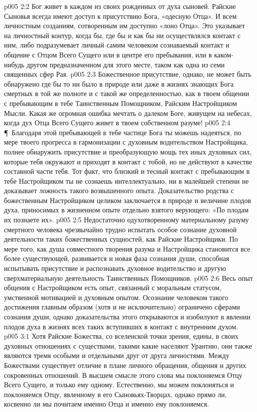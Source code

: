 \vs p005 2:2 Бог живет в каждом из своих рожденных от духа сыновей. Райские Сыновья всегда имеют доступ к присутствию Бога, «одесную Отца». И всем личностным созданиям, сотворенным им доступно «лоно Отца». Это указывает на личностный контур, когда бы, где бы и как бы ни осуществлялся контакт с ним, либо подразумевает личный самим человеком сознаваемый контакт и общение с Отцом Всего Сущего или в центре его пребывания, или в каком\hyp{}нибудь другом предназначенном для этого месте, таком как одна из семи священных сфер Рая.
\vs p005 2:3 Божественное присутствие, однако, не может быть обнаружено где бы то ни было в природе или даже в жизнях знающих Бога смертных в той же полноте и с такой же определенностью, как в твоем общении с пребывающим в тебе Таинственным Помощником, Райским Настройщиком Мысли. Какая же огромная ошибка мечтать о далеком Боге, живущем на небесах, когда дух Отца Всего Сущего живет в твоем собственном разуме!
\vs p005 2:4 \P\ Благодаря этой пребывающей в тебе частице Бога ты можешь надеяться, по мере твоего прогресса в гармонизации с духовным водительством Настройщика, полнее обнаружить присутствие и преобразующую мощь тех иных духовных сил, которые тебя окружают и приходят в контакт с тобой, но не действуют в качестве составной части тебя. Тот факт, что близкий и тесный контакт с пребывающим в тебе Настройщиком ты не сознаешь интеллектуально, ни в малейшей степени не доказывает ложность такого возвышенного опыта. Доказательство родства с божественным Настройщиком целиком заключается в природе и величине плодов духа, приносимых в жизненном опыте отдельно взятого верующего: «По плодам их познаете их».
\vs p005 2:5 Недостаточно одухотворенному материальному разуму смертного человека чрезвычайно трудно испытать особое сознание духовной деятельности таких божественных сущностей, как Райские Настройщики. По мере того, как душа совместного творения разума и Настройщика становится все более существующей, развивается и новая фаза сознания души, способная испытывать присутствие и распознавать духовное водительство и другую сверхматериальную деятельность Таинственных Помощников.
\vs p005 2:6 Весь опыт общения с Настройщиком есть опыт, связанный с моральным статусом, умственной мотивацией и духовным опытом. Осознание человеком такого достижения главным образом (хотя и не исключительно) ограничено сферами сознания души, однако доказательства этого открываются и изобилуют в явлении плодов духа в жизнях всех таких вступивших в контакт с внутренним духом.
\vs p005 3:1 Хотя Райские Божества, со вселенской точки зрения, едины, в своих духовных отношениях с существами, такими какие населяют Урантию, они также являются тремя особыми и отдельными друг от друга личностями. Между Божествами существует отличие в плане личного обращения, общения и других сокровенных отношений. В высшем смысле этого слова мы поклоняемся Отцу Всего Сущего, и только ему одному. Естественно, мы можем поклоняться и поклоняемся Отцу, явленному в его Сыновьях\hyp{}Творцах, однако прямо ли, косвенно ли мы почитаем именно Отца и именно ему поклоняемся.

